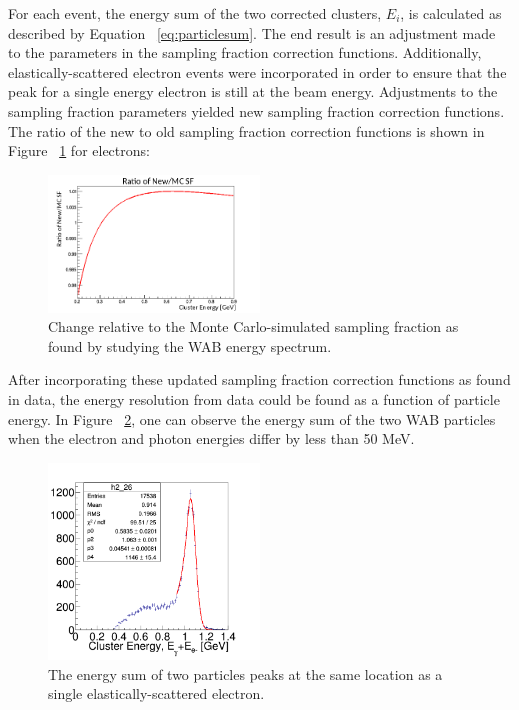\documentclass[twoside]{article}
\begin{document}
\begin{multicols}{2}
For each event, the energy sum of the two corrected clusters, $E_i$, is calculated as described by Equation ~\eqref{eq:particlesum}. The end result is an adjustment made to the parameters in the sampling fraction correction functions. Additionally, elastically-scattered electron events were incorporated in order to ensure that the peak for a single energy electron is still at the beam energy. Adjustments to the sampling fraction parameters yielded new sampling fraction correction functions. The ratio of the new to old sampling fraction correction functions is shown in Figure ~\ref{sfchange} for electrons:
\begin{figure}[H]
  \centering
      \includegraphics[width=0.5\textwidth]{pics/sfchangewab.png}
  \caption{Change relative to the Monte Carlo-simulated sampling fraction as found by studying the WAB energy spectrum.}
  \label{sfchange}
\end{figure} 

After incorporating these updated sampling fraction correction functions as found in data, the energy resolution from data could be found as a function of particle energy. In Figure ~\ref{wabsum}, one can observe the energy sum of the two WAB particles when the electron and photon energies differ by less than 50 MeV. 
\begin{figure}[H]
  \centering
      \includegraphics[width=0.5\textwidth]{pics/wabsum.png}
  \caption{The energy sum of two particles peaks at the same location as a single elastically-scattered electron.}
  \label{wabsum}
\end{figure}


\end{multicols}
\end{document}
